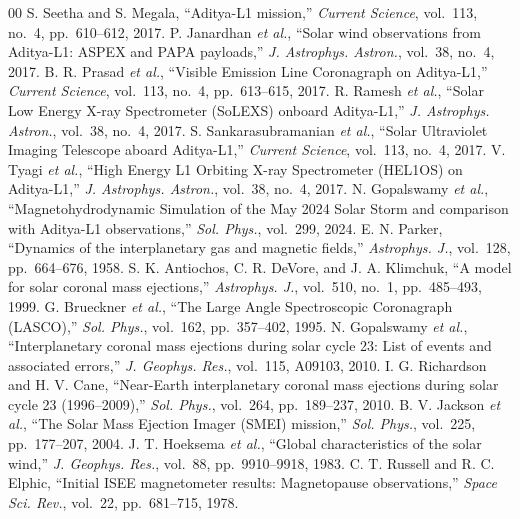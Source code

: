 \documentclass[conference,10pt,twocolumn]{IEEEtran}
\begin{document}
\begin{thebibliography}{00}
 S. Seetha and S. Megala, ``Aditya-L1 mission,'' \textit{Current Science}, vol.~113, no.~4, pp.~610--612, 2017.
 P. Janardhan \textit{et al.}, ``Solar wind observations from Aditya-L1: ASPEX and PAPA payloads,'' \textit{J. Astrophys. Astron.}, vol.~38, no.~4, 2017.
 B. R. Prasad \textit{et al.}, ``Visible Emission Line Coronagraph on Aditya-L1,'' \textit{Current Science}, vol.~113, no.~4, pp.~613--615, 2017.
 R. Ramesh \textit{et al.}, ``Solar Low Energy X-ray Spectrometer (SoLEXS) onboard Aditya-L1,'' \textit{J. Astrophys. Astron.}, vol.~38, no.~4, 2017.
 S. Sankarasubramanian \textit{et al.}, ``Solar Ultraviolet Imaging Telescope aboard Aditya-L1,'' \textit{Current Science}, vol.~113, no.~4, 2017.
 V. Tyagi \textit{et al.}, ``High Energy L1 Orbiting X-ray Spectrometer (HEL1OS) on Aditya-L1,'' \textit{J. Astrophys. Astron.}, vol.~38, no.~4, 2017.
 N. Gopalswamy \textit{et al.}, ``Magnetohydrodynamic Simulation of the May 2024 Solar Storm and comparison with Aditya-L1 observations,'' \textit{Sol. Phys.}, vol.~299, 2024.
 E. N. Parker, ``Dynamics of the interplanetary gas and magnetic fields,'' \textit{Astrophys. J.}, vol.~128, pp.~664--676, 1958.
 S. K. Antiochos, C. R. DeVore, and J. A. Klimchuk, ``A model for solar coronal mass ejections,'' \textit{Astrophys. J.}, vol.~510, no.~1, pp.~485--493, 1999.
 G. Brueckner \textit{et al.}, ``The Large Angle Spectroscopic Coronagraph (LASCO),'' \textit{Sol. Phys.}, vol.~162, pp.~357--402, 1995.
 N. Gopalswamy \textit{et al.}, ``Interplanetary coronal mass ejections during solar cycle 23: List of events and associated errors,'' \textit{J. Geophys. Res.}, vol.~115, A09103, 2010.
 I. G. Richardson and H. V. Cane, ``Near-Earth interplanetary coronal mass ejections during solar cycle 23 (1996--2009),'' \textit{Sol. Phys.}, vol.~264, pp.~189--237, 2010.
 B. V. Jackson \textit{et al.}, ``The Solar Mass Ejection Imager (SMEI) mission,'' \textit{Sol. Phys.}, vol.~225, pp.~177--207, 2004.
 J. T. Hoeksema \textit{et al.}, ``Global characteristics of the solar wind,'' \textit{J. Geophys. Res.}, vol.~88, pp.~9910--9918, 1983.
 C. T. Russell and R. C. Elphic, ``Initial ISEE magnetometer results: Magnetopause observations,'' \textit{Space Sci. Rev.}, vol.~22, pp.~681--715, 1978.

\end{thebibliography}
\end{document}
